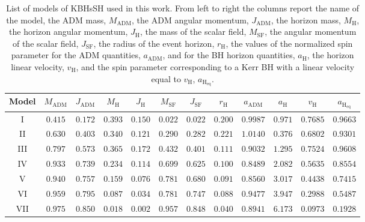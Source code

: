 \documentclass[twocolumn,aps,showpacs,showkeys,prd,superscriptaddress,byrevtex, amsmath]{revtex4-1}
\begin{document}
\begin{table}
\caption{List of models of KBHsSH used in this work. From left to right the columns report the name of the model, the ADM mass, $M_{\mathrm{ADM}}$, the ADM angular momentum, $J_{\mathrm{ADM}}$, the horizon mass, $M_{\mathrm{H}}$, the horizon angular momentum, $J_{\mathrm{H}}$, the mass of the scalar field, $M_{\mathrm{SF}}$, the angular momentum of the scalar field, $J_{\mathrm{SF}}$, the radius of the event horizon, $r_{\mathrm{H}}$, the values of the normalized spin parameter for the ADM quantities, $a_{\mathrm{ADM}}$, and for the BH horizon quantities, $a_{\mathrm{H}}$, the horizon linear velocity, $v_{\mathrm{H}}$, and the spin parameter corresponding to a Kerr BH with a linear velocity equal to $v_{\mathrm{H}}$, $a_{\mathrm{H_{eq}}}$.}        
\label{models_list}      
\centering          
\begin{tabular}{c c c c  c c c c   c c c c}
\hline\hline       
 Model & $M_{\mathrm{ADM}}$ & $J_{\mathrm{ADM}}$ & $M_{\mathrm{H}}$ &  $J_{\mathrm{H}}$ & $M_{\mathrm{SF}}$ & $J_{\mathrm{SF}}$ & $r_{\mathrm{H}}$ & $a_{\mathrm{ADM}}$ & $a_{\mathrm{H}}$ & $v_{\mathrm{H}}$ & $a_{\mathrm{H_{eq}}}$ \\ 
\hline           
I & $0.415$ & $0.172$ & $0.393$ &  $0.150$  & $0.022$ & $0.022$ & $0.200$ & $0.9987$ & $0.971$ & $0.7685$ & $0.9663$\\ 
 \hline 
II & $0.630$ & $0.403$ & $0.340$ &  $0.121$  & $0.290$ & $0.282$ & $0.221$ & $1.0140$ & $0.376$ & $0.6802$ & $0.9301$ \\
 \hline 
III & $0.797$ & $0.573$ & $0.365$ &  $0.172$  & $0.432$ & $0.401$ & $0.111$ & $0.9032$ & $1.295$ & $0.7524$ & $0.9608$ \\ 
 \hline 
IV & $0.933$ & $0.739$ & $0.234$ &  $0.114$  & $0.699$ & $0.625$ & $0.100$ & $0.8489$ & $2.082$ & $0.5635$ & $0.8554$ \\ 
 \hline 
V & $0.940$ & $0.757$ & $0.159$ &  $0.076$  & $0.781$ & $0.680$ & $0.091$ & $0.8560$ & $3.017$ & $0.4438$ & $0.7415$ \\ 
 \hline 
VI & $0.959$ & $0.795$ & $0.087$ &  $0.034$  & $0.781$ & $0.747$ & $0.088$ & $0.9477$ & $3.947$ & $0.2988$ & $0.5487$ \\ 
 \hline 
VII & $0.975$ & $0.850$ & $0.018$ &  $0.002$  & $0.957$ & $0.848$ & $0.040$ & $0.8941$ & $6.173$ & $0.0973$ & $0.1928$ \\ 
\hline      
\end{tabular}
\end{table}
\end{document}
